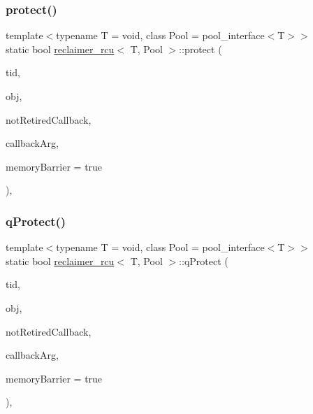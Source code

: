\subsubsection{\texorpdfstring{protect()}{protect()}}
{\footnotesize\ttfamily template$<$typename T  = void, class Pool  = pool\+\_\+interface$<$\+T$>$$>$ \\
static bool \hyperlink{classreclaimer__rcu}{reclaimer\+\_\+rcu}$<$ T, Pool $>$\+::protect (\begin{DoxyParamCaption}\item[{const int}]{tid,  }\item[{T $\ast$const}]{obj,  }\item[{\hyperlink{globals_8h_a57f5c0d40b156d7d996492fb2f16e3cd}{Callback\+Type}}]{not\+Retired\+Callback,  }\item[{\hyperlink{globals_8h_a3de64ef48066ac6430631c8b81a15345}{Callback\+Arg}}]{callback\+Arg,  }\item[{bool}]{memory\+Barrier = {\ttfamily true} }\end{DoxyParamCaption})\hspace{0.3cm}{\ttfamily [inline]}, {\ttfamily [static]}}

\mbox{\label{classreclaimer__rcu_ac1bb65eb5a5ebcc433094e72fa872b0c}} 
\subsubsection{\texorpdfstring{q\+Protect()}{qProtect()}}
{\footnotesize\ttfamily template$<$typename T  = void, class Pool  = pool\+\_\+interface$<$\+T$>$$>$ \\
static bool \hyperlink{classreclaimer__rcu}{reclaimer\+\_\+rcu}$<$ T, Pool $>$\+::q\+Protect (\begin{DoxyParamCaption}\item[{const int}]{tid,  }\item[{T $\ast$const}]{obj,  }\item[{\hyperlink{globals_8h_a57f5c0d40b156d7d996492fb2f16e3cd}{Callback\+Type}}]{not\+Retired\+Callback,  }\item[{\hyperlink{globals_8h_a3de64ef48066ac6430631c8b81a15345}{Callback\+Arg}}]{callback\+Arg,  }\item[{bool}]{memory\+Barrier = {\ttfamily true} }\end{DoxyParamCaption})\hspace{0.3cm}{\ttfamily [inline]}, {\ttfamily [static]}}

